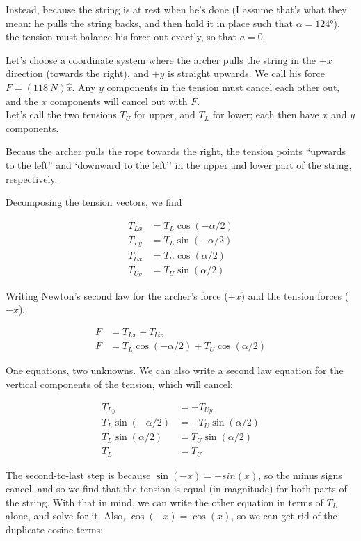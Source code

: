 \documentclass[12pt,a4paper]{report}
\begin{document}
Instead, because the string is at rest when he's done (I assume that's what they mean: he pulls the string backs, and then hold it in place such that $\alpha = \ang{124}$), the tension must balance his force out exactly, so that $a = 0$.

Let's choose a coordinate system where the archer pulls the string in the $+x$ direction (towards the right), and $+y$ is straight upwards. We call his force $F = (\SI{118}{N}) \hat{x}$. Any $y$ components in the tension must cancel each other out, and the $x$ components will cancel out with $F$.\\
Let's call the two tensions $T_U$ for upper, and $T_L$ for lower; each then have $x$ and $y$ components.

Becaus the archer pulls the rope towards the right, the tension points ``upwards to the left'' and `downward to the left'' in the upper and lower part of the string, respectively.

Decomposing the tension vectors, we find

\begin{align}
T_{Lx} &= T_L \cos (-\alpha/2)\\
T_{Ly} &= T_L \sin (-\alpha/2)\\
T_{Ux} &= T_U \cos (\alpha/2)\\
T_{Uy} &= T_U \sin (\alpha/2)
\end{align}

Writing Newton's second law for the archer's force ($+x$) and the tension forces ($-x$):

\begin{align}
F &= T_{Lx} + T_{Ux}\\
F &= T_L \cos (-\alpha/2) + T_U \cos (\alpha/2)
\end{align}

One equations, two unknowns. We can also write a second law equation for the vertical components of the tension, which will cancel:

\begin{align}
T_{Ly} &= -T_{Uy}\\
T_L \sin (-\alpha/2) &= -T_U \sin (\alpha/2)\\
T_L \sin (\alpha/2) &= T_U \sin (\alpha/2)\\
T_L &= T_U
\end{align}

The second-to-last step is because $\sin(-x) = -sin(x)$, so the minus signs cancel, and so we find that the tension is equal (in magnitude) for both parts of the string. With that in mind, we can write the other equation in terms of $T_L$ alone, and solve for it. Also, $\cos(-x) = \cos(x)$, so we can get rid of the duplicate cosine terms:
\end{document}
